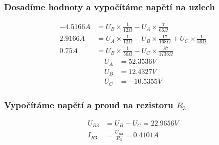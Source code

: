 \subsubsection{Dosadíme hodnoty a vypočítáme napětí na uzlech}
\begin{align*}
-4.5166 A &= U_B \times \frac {1} {12\Omega} - U_A \times \frac {7} {66\Omega}\\
2.9166 A &= U_A \times \frac {1} {12\Omega} - U_B \times \frac {17} {168\Omega} + U_C \times \frac {1} {56\Omega}\\
0.75 A &= U_B \times \frac {1} {56\Omega} - U_C \times \frac {87} {1736\Omega}
\end{align*}
\begin{align*}
U_A &= 52.3536 V\\
U_B &= 12.4327 V\\
U_C &= -10.5355 V
\end{align*}
\subsubsection{Vypočítáme napětí a proud na rezistoru $R_3$}
\begin{align*}
U_{R3} &= U_B - U_C = 22.9656 V\\
I_{R3} &= \frac {U_{R3}} {R_3} = 0.4101 A
\end{align*}